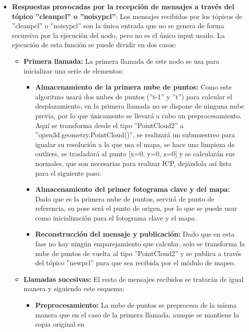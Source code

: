 \documentclass[12pt, a4paper, twoside]{article}
\begin{document}
\begin{itemize}
\begin{itemize}
  \end{itemize}
   \item \textbf{Respuestas provocadas por la recepción de mensajes a través del tópico ''clean\textunderscore pcl'' o ''noisy\textunderscore pcl''}:
    Los mensajes recibidos por los tópicos de ''clean\textunderscore pcl'' o ''noisy\textunderscore pcl'' son la única entrada que no se genera de forma recursiva por 
    la ejecución del nodo, pero no es el único input usado. La ejecución de esta función se puede dividir en dos casos:
    \begin{itemize}
      \item \textbf{Primera llamada:} La primera llamada de este nodo se usa para inicializar una serie de elementos:
      \begin{itemize}
        \item \textbf{Almacenamiento de la primera nube de puntos:} Como este algoritmo usará dos nubes de puntos (''t-1'' y ''t'') para calcular el desplazamiento, en 
        la primera llamada no se dispone de ninguna nube previa, por lo que únicamente se llevará a cabo un preprocesamiento. \newline Aquí se transforma desde el tipo ''PointCloud2'' a 
        ''open3d.geometry.PointCloud()'', se realizará un submuestreo para igualar su resolución a la que usa el mapa, se hace una limpieza de outliers, se trasladará al 
        punto [x=0, y=0, z=0] y se calcularán sus normales, que son necesarias para realizar ICP, dejándola así lista para el siguiente paso.
        \item \textbf{Almacenamiento del primer fotograma clave y del mapa:} Dado que es la primera nube de puntos, servirá de punto de referencia, su pose 
        será el punto de origen, por lo que se puede usar como inicialización para el fotograma clave y el mapa.
        \item \textbf{Reconstrucción del mensaje y publicación:} Dado que en esta fase no hay ningún emparejamiento que calcular, solo se transforma la nube de puntos 
        de vuelta al tipo ''PointCloud2'' y se publica a través del tópico ''new\textunderscore pcl'' para que sea recibida por el módulo de mapeo.
      \end{itemize}
      \item \textbf{Llamadas sucesivas:} El resto de mensajes recibidos se tratarán de igual manera y siguiendo este esquema:
      \begin{itemize}
        \item \textbf{Preprocesamiento:} La nube de puntos se preprocesa de la misma manera que en el caso de la primera llamada, aunque se mantiene la copia original en 

\end{itemize}
\end{itemize}
\end{itemize}
\end{document}
